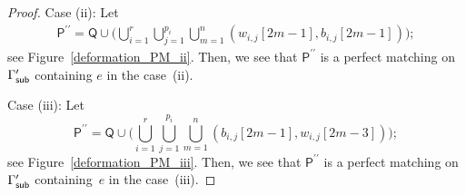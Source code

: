 \documentclass[pdftex]{sigma}%
\numberwithin{equation}{section}
\numberwithin{figure}{section}
\numberwithin{table}{section}
\newcommand{\sfP}{\mathsf{P}}
\newcommand{\sfQ}{\mathsf{Q}}
\begin{document}
\begin{proof}
Case (ii): Let \begin{gather*}%
\sfP^{\prime\prime}=\sfQ \cup \bigg(\bigcup_{i=1}^r \bigcup_{j=1}^{p_i} \bigcup_{m=1}^n(w_{i,j}[2m-1],b_{i,j}[2m-1])\bigg);
\end{gather*}
see Figure~\ref{deformation_PM_ii}. Then, we see that $\sfP^{\prime\prime}$ is a perfect matching on $\Gamma^\prime_{\sf sub}$ containing $e$ in the case~(ii).

Case (iii): Let \begin{displaymath}
\sfP^{\prime\prime}=\sfQ \cup \bigg(\bigcup_{i=1}^r \bigcup_{j=1}^{p_i} \bigcup_{m=1}^n(b_{i,j}[2m-1],w_{i,j}[2m-3])\bigg); \end{displaymath}
see Figure~\ref{deformation_PM_iii}. Then, we see that $\sfP^{\prime\prime}$ is a perfect matching on $\Gamma^\prime_{\sf sub}$ containing~$e$ in the case~(iii).


\end{proof}
\end{document}
